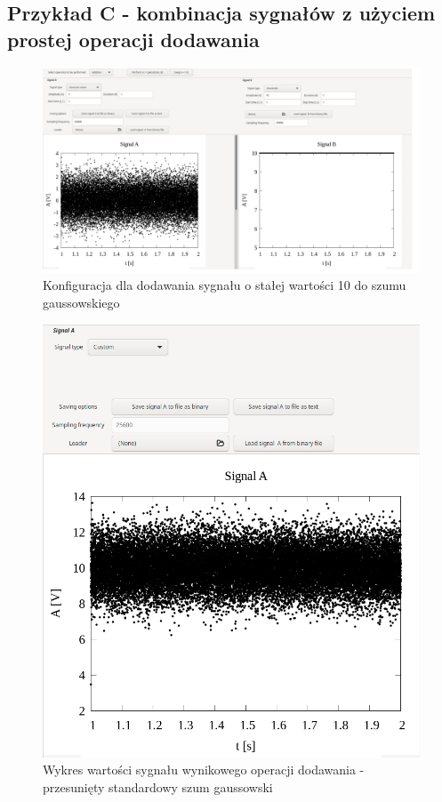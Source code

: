 \documentclass{article}
\begin{document}
\subsection{Przykład C - kombinacja sygnałów z użyciem prostej operacji dodawania}
\begin{figure}[h!]
 \centering
 \includegraphics[width=14cm]{add_plotconfig.png}
 \vspace{-0.3cm}
 \caption{Konfiguracja dla dodawania sygnału o stałej wartości 10 do szumu gaussowskiego}
 \label{fig:add_plotconfig}
\end{figure}
\newpage
\begin{figure}[h!]
 \centering
 \includegraphics[width=14cm]{shifted_gauss.png}
 \vspace{-0.3cm}
 \caption{Wykres wartości sygnału wynikowego operacji dodawania - przesunięty standardowy szum gaussowski}
 \label{fig:shifted_gauss}
\end{figure}
\end{document}
